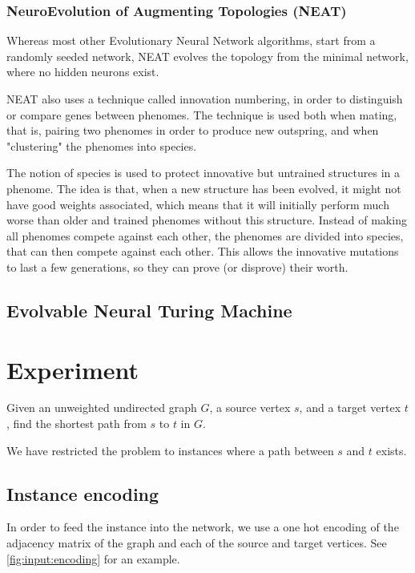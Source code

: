 \documentclass{article}
\begin{document}
\subsubsection{NeuroEvolution of Augmenting Topologies (NEAT)}
Whereas most other Evolutionary Neural Network algorithms, start from a randomly seeded network, NEAT evolves the topology from the minimal network, where no hidden neurons exist.

NEAT also uses a technique called innovation numbering, in order to distinguish or compare genes between phenomes. The technique is used both when mating, that is, pairing two phenomes in order to produce new outspring, and when "clustering" the phenomes into species.

The notion of species is used to protect innovative but untrained structures in a phenome. The idea is that, when a new structure has been evolved, it might not have good weights associated, which means that it will initially perform much worse than older and trained phenomes without this structure. Instead of making all phenomes compete against each other, the phenomes are divided into species, that can then compete against each other. This allows the innovative mutations to last a few generations, so they can prove (or disprove) their worth.

\subsection{Evolvable Neural Turing Machine}


\section{Experiment}
Given an unweighted undirected graph $G$, a source vertex $s$, and a target vertex $t$, find the shortest path from $s$ to $t$ in $G$.

We have restricted the problem to instances where a path between $s$ and $t$ exists.

\subsection{Instance encoding}
In order to feed the instance into the network, we use a one hot encoding of the adjacency matrix of the graph and each of the source and target vertices. See \autoref{fig:input:encoding} for an example.
\end{document}

